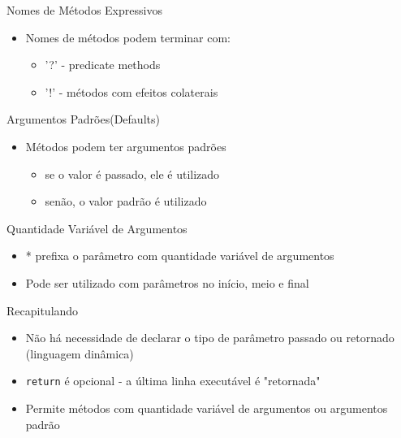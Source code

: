 \begin{frame}[fragile,t]{Nomes de Métodos Expressivos}
  \begin{itemize}
    \item Nomes de métodos podem terminar com:
    \begin{itemize}
    	\item \alert{'?'} - predicate methods
    	\item \alert{'!'} - métodos com efeitos colaterais
    \end{itemize}
    
	
  \end{itemize}   
\end{frame}

\begin{frame}[fragile,t]{Argumentos Padrões(Defaults)}
  \begin{itemize}
    \item Métodos podem ter argumentos padrões
    \begin{itemize}
    	\item se o valor é passado, ele é utilizado
    	\item senão, o valor padrão é utilizado
    \end{itemize}
  \end{itemize}  
  
\end{frame}

\begin{frame}[fragile,t]{Quantidade Variável de Argumentos}
  \begin{itemize}
    \item \alert{*} prefixa o parâmetro com quantidade variável de argumentos
  \end{itemize}
  \begin{itemize}
    \item Pode ser utilizado com parâmetros no início, meio e final
  \end{itemize}
  
\end{frame}

\begin{frame}[fragile,t]{Recapitulando}
  \begin{itemize}
    \item \alert{Não há necessidade} de declarar o tipo de parâmetro passado ou retornado (linguagem dinâmica)
    \item \verb!return! é \alert{opcional} - a última linha executável é "retornada"
    \item Permite métodos com \alert{quantidade variável} de argumentos ou argumentos padrão
  \end{itemize}
\end{frame}



